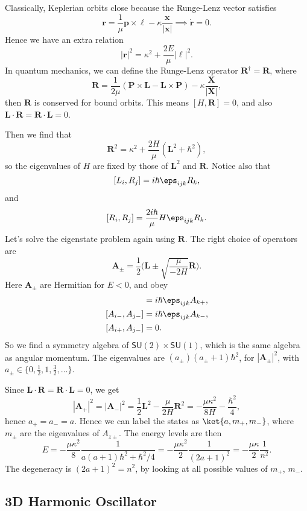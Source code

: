 \documentclass[12pt]{article}
\begin{document}
Classically, Keplerian orbits close because the Runge-Lenz vector satisfies
\[
\mathbf{r} = \frac{1}{\mu} \mathbf{p} \times \bm{\ell} - \kappa \frac{\mathbf{x}}{|\mathbf{x}|} \implies \mathbf{\dot r} = 0.
\]
Hence we have an extra relation
\[
|\mathbf{r}|^2 = \kappa^2 + \frac{2E}{\mu}|\bm{\ell }|^2.
\]
In quantum mechanics, we can define the Runge-Lenz operator $\mathbf{R}^{\dagger} = \mathbf{R}$, where
\[
\mathbf{R} = \frac{1}{2 \mu} (\mathbf{P} \times \mathbf{L} - \mathbf{L} \times \mathbf{P}) - \kappa \frac{\mathbf{X}}{|\mathbf{X}|},
\]
then $\mathbf{R}$ is conserved for bound orbits. This means $[H, \mathbf{R}] = 0$, and also $\mathbf{L} \cdot \mathbf{R} = \mathbf{R} \cdot \mathbf{L} = 0$.

Then we find that
\[
\mathbf{R}^2 = \kappa^2 + \frac{2H}{\mu}(\mathbf{L}^2 + \hbar^2),
\]
so the eigenvalues of $H$ are fixed by those of $\mathbf{L}^2$ and $\mathbf{R}$. Notice also that
\[
	[L_i, R_j] = i \hbar \eps_{ijk} R_k,
\]
and
\[
	[R_i, R_j] = \frac{2i \hbar}{\mu} H \eps_{ijk} R_k.
\]
Let's solve the eigenstate problem again using $\mathbf{R}$. The right choice of operators are
\[
	\mathbf{A}_{\pm} = \frac{1}{2} \biggl( \mathbf{L} \pm \sqrt{\frac{\mu}{-2H}} \mathbf{R} \biggr).
\]
Here $\mathbf{A}_{\pm}$ are Hermitian for $E < 0$, and obey
\begin{align*}
	[A_{i+}, A_{j+}] &= i \hbar\eps_{ijk} A_{k+}, \\
	[A_{i-}, A_{j-}] &= i \hbar \eps_{ijk} A_{k-},\\
	[A_{i+}, A_{j-}] &= 0.
\end{align*}
So we find a symmetry algebra of $\mathsf{SU}(2) \times \mathsf{SU}(1)$, which is the same algebra as angular momentum. The eigenvalues are  $(a_{\pm})(a_{\pm}+1)\hbar^2$, for $|\mathbf{A}_{\pm}|^2$, with $a_{\pm} \in \{0, \frac{1}{2}, 1, \frac{3}{2}, \ldots \}$.

Since $\mathbf{L} \cdot \mathbf{R} = \mathbf{R} \cdot \mathbf{L} = 0$, we get
\[
|\mathbf{A}_+|^2 = |\mathbf{A}_-|^2 = \frac{1}{2}\mathbf{L}^2 - \frac{\mu}{2H} \mathbf{R}^2 = - \frac{\mu \kappa^2}{8H} - \frac{\hbar^2}{4},
\]
hence $a_+ = a_- = a$. Hence we can label the states as $\ket{a, m_+, m_-}$, where $m_{\pm}$ are the eigenvalues of $A_{z\pm}$. The energy levels are then
\[
E = - \frac{\mu \kappa^2}{8} \frac{1}{a(a+1)\hbar^2 + \hbar^2/4} = - \frac{\mu \kappa^2}{2} \frac{1}{(2a + 1)^2} = - \frac{\mu \kappa}{2} \frac{1}{n^2}.
\]
The degeneracy is $(2a+1)^2 = n^2$, by looking at all possible values of $m_+$, $m_-$.

\subsection{3D Harmonic Oscillator}
\label{sub:3d_ho}
\end{document}
